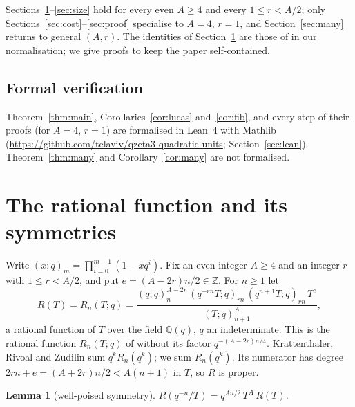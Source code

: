 \documentclass[11pt]{amsart}
\newtheorem{lemma}[theorem]{Lemma}
\theoremstyle{definition}
\theoremstyle{remark}
\numberwithin{equation}{section}
\newcommand{\ZZ}{\mathbb{Z}}
\newcommand{\QQ}{\mathbb{Q}}
\begin{document}
Sections~\ref{sec:R}--\ref{sec:size} hold for every even $A\ge4$ and every $1\le r<A/2$; only
Sections~\ref{sec:cost}--\ref{sec:proof} specialise to $A=4$, $r=1$, and Section~\ref{sec:many} returns to general
$(A,r)$. The identities of Section~\ref{sec:R} are those of \cite{KRZ06} in our normalisation; we give proofs to keep
the paper self-contained.

\subsection*{Formal verification}
Theorem~\ref{thm:main}, Corollaries~\ref{cor:lucas} and~\ref{cor:fib}, and every step of their proofs (for $A=4$,
$r=1$) are formalised in Lean~4 with Mathlib (\url{https://github.com/telaviv/qzeta3-quadratic-units}; Section~\ref{sec:lean}).
Theorem~\ref{thm:many} and Corollary~\ref{cor:many} are not formalised.

\section{The rational function and its symmetries}\label{sec:R}

Write $(x;q)_m=\prod_{i=0}^{m-1}(1-xq^i)$. Fix an even integer $A\ge4$ and an integer $r$ with $1\le r<A/2$, and put
$e=(A-2r)n/2\in\ZZ$. For $n\ge1$ let
\begin{equation}\label{eq:R}
R(T)=R_n(T;q)=\frac{(q;q)_n^{A-2r}\,(q^{-rn}T;q)_{rn}\,(q^{n+1}T;q)_{rn}\,T^e}{(T;q)_{n+1}^A},
\end{equation}
a rational function of $T$ over the field $\QQ(q)$, $q$ an indeterminate. This is the rational function $R_n(T;q)$ of
\cite[\S3.3]{KRZ06} without its factor $q^{-(A-2r)n/4}$. Krattenthaler, Rivoal and Zudilin sum $q^kR_n(q^k)$; we sum
$R_n(q^k)$. Its numerator has degree $2rn+e=(A+2r)n/2<A(n+1)$ in $T$, so $R$ is proper.

\begin{lemma}[well-poised symmetry]\label{lem:wp}
$R(q^{-n}/T)=q^{An/2}\,T^A\,R(T)$.
\end{lemma}
\end{document}
